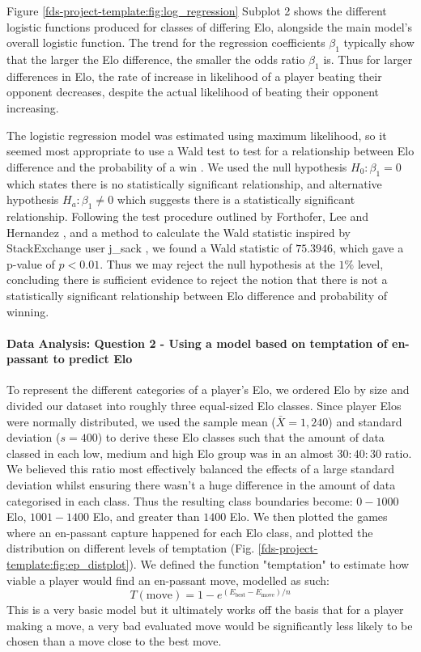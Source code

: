 \documentclass[10pt,a4paper]{article}
\begin{document}
\begin{multicols}{2}
Figure \ref{fds-project-template:fig:log_regression} Subplot 2 shows the different logistic functions produced for classes of differing Elo, alongside the main model's overall logistic function. The trend for the regression coefficients $\beta_{1}$ typically show that the larger the Elo difference, the smaller the odds ratio $\beta_{1}$ is. Thus for larger differences in Elo, the rate of increase in likelihood of a player beating their opponent decreases, despite the actual likelihood of beating their opponent increasing. \newline

The logistic regression model was estimated using maximum likelihood, so it seemed most appropriate to use a Wald test to test for a relationship between Elo difference and the probability of a win \cite{WaldTest}. We used the null hypothesis $H_{0}: \beta_{1} = 0$ which states there is no statistically significant relationship, and alternative hypothesis $H_{a}: \beta_{1} \neq 0$ which suggests there is a statistically significant relationship. Following the test procedure outlined by Forthofer, Lee and Hernandez \cite{WaldTest}, and a method to calculate the Wald statistic inspired by StackExchange user j\_sack \cite{StackExchangeWaldTest}, we found a Wald statistic of $75.3946$, which gave a p-value of $p<0.01$. Thus we may reject the null hypothesis at the $1\%$ level, concluding there is sufficient evidence to reject the notion that there is not a statistically significant relationship between Elo difference and probability of winning. \newline

\paragraph{Data Analysis: Question 2 - Using a model based on temptation of en-passant to predict Elo}
To represent the different categories of a player's Elo, we ordered Elo by size and divided our dataset into roughly three equal-sized Elo classes. Since player Elos were normally distributed, we used the sample mean ($\bar{X} = 1,240$) and standard deviation ($s = 400$) to derive these Elo classes such that the amount of data classed in each low, medium and high Elo group was in an almost $30:40:30$ ratio. We believed this ratio most effectively balanced the effects of a large standard deviation whilst ensuring there wasn't a huge difference in the amount of data categorised in each class.
Thus the resulting class boundaries become: $0 - 1000$ Elo, $1001 - 1400$ Elo, and greater than $1400$ Elo. We then plotted the games where an en-passant capture happened for each Elo class, and plotted the distribution on different levels of temptation (Fig. \ref{fds-project-template:fig:ep_distplot}). We defined the function "temptation" to estimate how viable a player would find an en-passant move, modelled as such:
$$T(\text{move})= 1 -e^{(E_{\text{best}} - E_{\text{move}})/{n}}$$
This is a very basic model but it ultimately works off the basis that for a player making a move, a very bad evaluated move would be significantly less likely to be chosen than a move close to the best move.\newline


\end{multicols}
\end{document}
